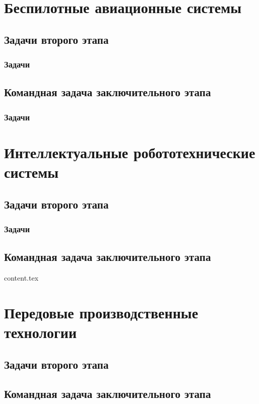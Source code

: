 \documentclass[a4paper,12pt,oneside]{book}
\begin{document}
\part{Беспилотные авиационные системы}
\clearpage 
\chapter{Задачи второго этапа}
\section{Задачи}

\clearpage
\chapter{Командная задача заключительного этапа}
\section{Задачи}


\part{Интеллектуальные робототехнические системы}
\clearpage
\chapter{Задачи второго этапа}
\section{Задачи}

\clearpage
\chapter{Командная задача заключительного этапа}
{content.tex}

\part{Передовые производственные технологии}
\clearpage
\chapter{Задачи второго этапа}

\clearpage
\chapter{Командная задача заключительного этапа}

\end{document}
